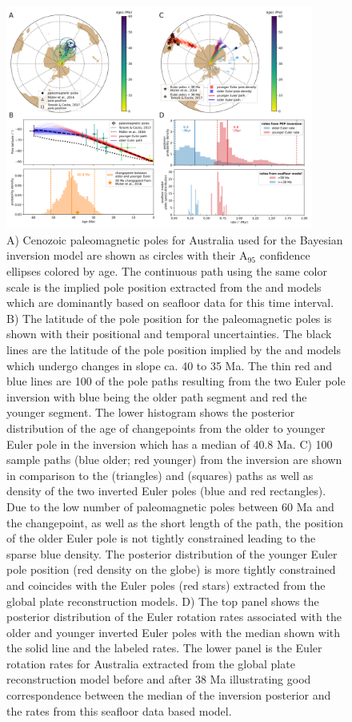 \documentclass[11pt,letterpaper]{article}
\begin{document}
\begin{figure}
\includegraphics[width=0.9\textwidth]{fig_aus_inversion.png}
\caption{A) Cenozoic paleomagnetic poles for Australia used for the Bayesian inversion model are shown as circles with their A$_{95}$ confidence ellipses colored by age. The continuous path using the same color scale is the implied pole position extracted from the \cite{Muller2016a} and \cite{Torsvik2017a} models which are dominantly based on seafloor data for this time interval. B) The latitude of the pole position for the paleomagnetic poles is shown with their positional and temporal uncertainties. The black lines are the latitude of the pole position implied by the \cite{Muller2016a} and \cite{Torsvik2017a} models which undergo changes in slope ca. 40 to 35 Ma. The thin red and blue lines are 100 of the pole paths resulting from the two Euler pole inversion with blue being the older path segment and red the younger segment. The lower histogram shows the posterior distribution of the age of changepoints from the older to younger Euler pole in the inversion which has a median of 40.8 Ma. C) 100 sample paths (blue older; red younger) from the inversion are shown in comparison to the \cite{Muller2016a} (triangles) and \cite{Torsvik2017a} (squares) paths as well as density of the two inverted Euler poles (blue and red rectangles). Due to the low number of paleomagnetic poles between 60 Ma and the changepoint, as well as the short length of the path, the position of the older Euler pole is not tightly constrained leading to the sparse blue density. The posterior distribution of the younger Euler pole position (red density on the globe) is more tightly constrained and coincides with the Euler poles (red stars) extracted from the global plate reconstruction models. D) The top panel shows the posterior distribution of the Euler rotation rates associated with the older and younger inverted Euler poles with the median shown with the solid line and the labeled rates. The lower panel is the Euler rotation rates for Australia extracted from the \cite{Muller2016a} global plate reconstruction model before and after 38 Ma illustrating good correspondence between the median of the inversion posterior and the rates from this seafloor data based model.}
\label{fig:Aus_Cenozoic_track}
\end{figure}
\end{document}
